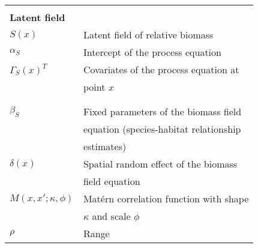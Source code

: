 \begin{center}
\begin{longtable}{ll}
                                  &                                                                                                                                         \\
\textbf{Latent field}             &                                                                                                                                         \\
\(S(x)\)                          & Latent field of relative biomass                                                                                                        \\
\(\alpha_S\)                      & Intercept of the process equation                                                                                                       \\
\(\Gamma_{S}(x)^{T}\)             & Covariates of the process equation at \\
                                  & point \(x\) \\                                                                                             \\
                                  &                                                                                                                                         \\
\(\beta_S\)                       & Fixed parameters of the biomass field \\
                                  & equation (species-habitat relationship \\
                                  & estimates)                                                 
\\
\(\delta(x)\)                      & Spatial random effect of the biomass \\
                                  & field equation                                                                                     \\
\(M(x,x';\kappa,\phi)\)           & Matérn correlation function with shape \\
                                  & \(\kappa\) and scale \(\phi\)                                                                                                                                                                                                                                 \\
\(\rho\)                          & Range                                                                                                                                   \\

\end{longtable}
\end{center}

